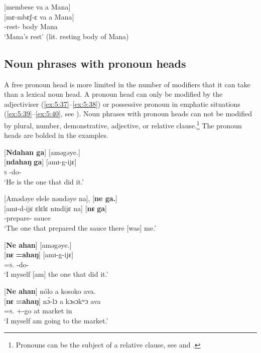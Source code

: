\ea \label{ex:5:36}
{} [membese va  a  Mana]\\
\gll  {}[mɛ-mbɛʃ-ɛ     va   a   Mana]\\
      \NOM-rest-{\CL}    body   {\GEN}  Mana\\
\glt  ‘Mana’s rest’ (lit. resting body of Mana)
\z

\subsection{Noun phrases with pronoun heads}\label{sec:5.2.2}
\hypertarget{RefHeading1211641525720847}{}
A free pronoun head is more limited in the number of modifiers that it can take than a lexical noun head. A pronoun head can only be modified by the adjectiviser (\ref{ex:5:37}--\ref{ex:5:38}) or possessive pronoun in emphatic situations (\ref{ex:5:39}--\ref{ex:5:40}, see ). Noun phrases with pronoun heads can not be modified by plural, number, demonstrative, adjective, or relative clause.\footnote{Pronouns can be the subject of a relative clause, see  and .} The pronoun heads are bolded in the examples. 

\ea \label{ex:5:37}
{}[\textbf{Ndahan  ga}]  [aməgəye.]\\
\gll  {}[\textbf{ndahaŋ}  \textbf{ga}]  [amɪ-g-ijɛ]\\
      \textsc{s}    {\ADJ}  {\DEP}-do-{\CL}\\
\glt  ‘He is the one that did it.’ 
\z

\ea \label{ex:5:38}
{}[Amədəye  elele  nəndəye  na],  [\textbf{ne  ga.}]\\
\gll  {}[amɪ-d-ijɛ    ɛlɛlɛ  nɪndijɛ  na]  [\textbf{nɛ}  \textbf{ga}]\\
      {\DEP}-prepare{}-{\CL}  sauce  {\DEM}  {\PSP}  {\oneS}  {\ADJ}\\
\glt  ‘The one that prepared the sauce there [was] me.’
\z

\ea \label{ex:5:39}
{}[\textbf{Ne  ahan}]  [aməgəye.]\\
\gll  {}[\textbf{nɛ}  \textbf{=ahaŋ}]    [amɪ-g-ijɛ]\\
      {\oneS}  =\textsc{s}.{\POSS}  {\DEP}-do-{\CL}\\
\glt  ‘I myself [am] the one that did it.’ 
\z

\clearpage
\ea \label{ex:5:40}
{}[\textbf{Ne  ahan}]  nólo  a  kosoko  ava.\\
\gll  {}[\textbf{nɛ} \textbf{=ahaŋ}]    n\'{ɔ}-lɔ    a  kɔsɔkʷɔ  ava\\
      {\oneS}  =\textsc{s}.{\POSS}  {\oneS}+{\IFV}-go  at  market  in\\
\glt  ‘I myself am going to the market.’
\z

